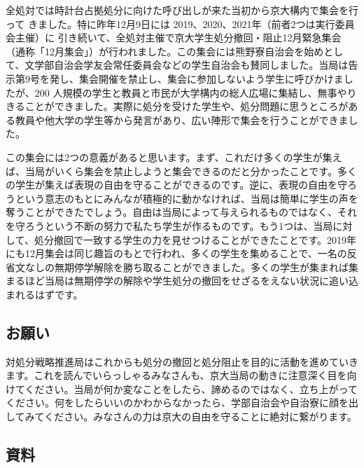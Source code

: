 全処対では時計台占拠処分に向けた呼び出しが来た当初から京大構内で集会を行って
きました。特に昨年12月9日には 2019、2020、2021年（前者2つは実行委員会主催）に
引き続いて、全処対主催で京大学生処分撤回・阻止12月緊急集会（通称「12月集会」）が行われました。この集会には熊野寮自治会を始めとして、文学部自治会学友会常任委員会などの学生自治会も賛同しました。当局は告示第9号を発し、集会開催を禁止し、集会に参加しないよう学生に呼びかけましたが、200 人規模の学生と教員と市民が大学構内の総人広場に集結し、無事やりきることができました。実際に処分を受けた学生や、処分問題に思うところがある教員や他大学の学生等から発言があり、広い陣形で集会を行うことができました。

この集会には2つの意義があると思います。まず、これだけ多くの学生が集えば、当局がいくら集会を禁止しようと集会できるのだと分かったことです。多くの学生が集えば表現の自由を守ることができるのです。逆に、表現の自由を守ろうという意志のもとにみんなが積極的に動かなければ、当局は簡単に学生の声を奪うことができたでしょう。自由は当局によって与えられるものではなく、それを守ろうという不断の努力で私たち学生が作るものです。もう1つは、当局に対して、処分撤回で一致する学生の力を見せつけることができたことです。2019年にも12月集会は同じ趣旨のもとで行われ、多くの学生を集めることで、一名の反省文なしの無期停学解除を勝ち取ることができました。多くの学生が集まれば集まるほど当局は無期停学の解除や学生処分の撤回をせざるをえない状況に追い込まれるはずです。


\subsection{お願い}
対処分戦略推進局はこれからも処分の撤回と処分阻止を目的に活動を進めていきます。これを読んでいらっしゃるみなさんも、京大当局の動きに注意深く目を向けてください。当局が何か変なことをしたら、諦めるのではなく、立ち上がってください。何をしたらいいのかわからなかったら、学部自治会や自治寮に顔を出してみてください。みなさんの力は京大の自由を守ることに絶対に繋がります。


\subsection{資料}

